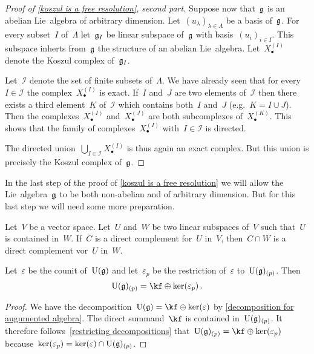 \begin{proof}[Proof of \cref{koszul is a free resolution}, second part]
	Suppose now that~$\mathfrak{g}$ is an abelian Lie~algebra of arbitrary dimension.
	Let~$(u_\lambda)_{\lambda \in \Lambda}$ be a basis of~$\mathfrak{g}$.
	For every subset~$I$ of~$\Lambda$ let~$\mathfrak{g}_I$ be linear subspace of~$\mathfrak{g}$ with basis~$(u_i)_{i \in I}$.
	This subspace inherts from~$\mathfrak{g}$ the structure of an abelian Lie~algebra.
	Let~$X^{(I)}_\bullet$ denote the Koszul complex of~$\mathfrak{g}_I$.

	Let~$\mathcal{I}$ denote the set of finite subsets of~$\Lambda$.
	We have already seen that for every~$I \in \mathcal{I}$ the complex~$X^{(I)}_\bullet$ is exact.
	If~$I$ and~$J$ are two elements of~$\mathcal{I}$ then there exists a third element~$K$ of~$\mathcal{I}$ which contains both~$I$ and~$J$ (e.g.~$K = I \cup J$).
	Then the complexes~$X^{(I)}_\bullet$ and~$X^{(J)}_\bullet$ are both subcomplexes of~$X^{(K)}_\bullet$.
	This shows that the family of complexes~$X^{(I)}_\bullet$ with~$I \in \mathcal{I}$ is directed.

	The directed union~$\bigcup_{I \in \mathcal{I}} X^{(I)}_\bullet$ is thus again an exact complex.
	But this union is precisely the Koszul complex of~$\mathfrak{g}$.
\end{proof}


\begin{fluff}
	In the last step of the proof of \cref{koszul is a free resolution} we will allow the Lie~algebra~$\mathfrak{g}$ to be both non-abelian and of arbitrary dimension.
	But for this last step we will need some more preparation.
\end{fluff}


\begin{recall}
	\label{restricting decompositions}
	Let~$V$ be a vector space.
	Let~$U$ and~$W$ be two linear subspaces of~$V$ such that~$U$ is contained in~$W$.
	If~$C$ is a direct complement for~$U$ in~$V$, then~$C \cap W$ is a direct complement vor~$U$ in~$W$.
\end{recall}


\begin{lemma}
	\label{decomposition for restricted counit}
	Let~$\varepsilon$ be the counit of~$\operatorname{U}(\mathfrak{g})$ and let~$\varepsilon_p$ be the restriction of~$\varepsilon$ to~$\operatorname{U}(\mathfrak{g})_{(p)}$.
	Then
	\[
		\Univ(\glie)_{(p)}
		=
		\kf \oplus \ker(\varepsilon_p) \,.
	\]
\end{lemma}


\begin{proof}
	We have the decomposition~$\Univ(\glie) = \kf \oplus \ker(\varepsilon)$ by \cref{decomposition for augumented algebra}.
	The direct summand~$\kf$ is contained in~$\operatorname{U}(\mathfrak{g})_{(p)}$.
	It therefore follows~\cref{restricting decompositions} that~$\Univ(\glie)_{(p)} = \kf \oplus \ker(\varepsilon_p)$ because~$\ker(\varepsilon_p) = \ker(\varepsilon) \cap \operatorname{U}(\mathfrak{g})_{(p)}$.
\end{proof}


